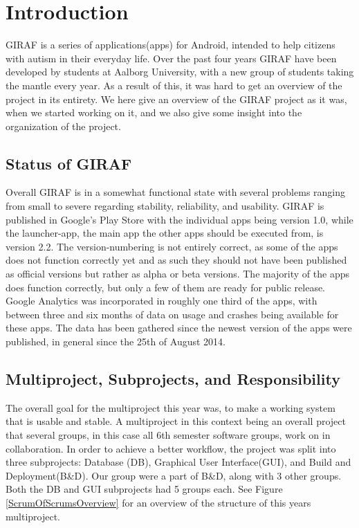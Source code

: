 \chapter{Introduction} \label{ChapIntroduction}
GIRAF is a series of applications(apps) for Android, intended to help citizens with autism in their everyday life. Over the past four years GIRAF have been developed by students at Aalborg University, with a new group of students taking the mantle every year. As a result of this, it was hard to get an overview of the project in its entirety. We here give an overview of the GIRAF project as it was, when we started working on it, and we also give some insight into the organization of the project.

\section{Status of GIRAF} %
Overall GIRAF is in a somewhat functional state with several problems ranging from small to severe regarding stability, reliability, and usability.
GIRAF is published in Google's Play Store with the individual apps being version 1.0, while the launcher-app, the main app the other apps should be executed from, is version 2.2. The version-numbering is not entirely correct, as some of the apps does not function correctly yet and as such they should not have been published as official versions but rather as alpha or beta versions. The majority of the apps does function correctly, but only a few of them are ready for public release.
Google Analytics was incorporated in roughly one third of the apps, with between three and six months of data on usage and crashes being available for these apps. The data has been gathered since the newest version of the apps were published, in general since the 25th of August 2014.

\section{Multiproject, Subprojects, and Responsibility} %
The overall goal for the multiproject this year was, to make a working system that is usable and stable. A multiproject in this context being an overall project that several groups, in this case all 6th semester software groups, work on in collaboration. In order to achieve a better workflow, the project was split into three subprojects: Database (DB), Graphical User Interface(GUI), and Build and Deployment(B\&D). Our group were a part of B\&D, along with 3 other groups. Both the DB and GUI subprojects had 5 groups each. See Figure \ref{ScrumOfScrumsOverview} for an overview of the structure of this years multiproject.

